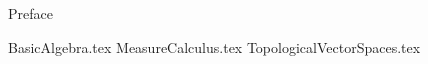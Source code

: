 \documentclass[
    oneside
]{mori-book}
\begin{document}
    \makecoverpage
    \maketitlepage

    \frontmatter
    \pagestyle{front}
    {Preface}

    \maketocpage

    \mainmatter
    \pagestyle{main}

    {BasicAlgebra.tex}
    {MeasureCalculus.tex}
    {TopologicalVectorSpaces.tex}
    
    \printindex
    \printnomenclature
    
\end{document}
